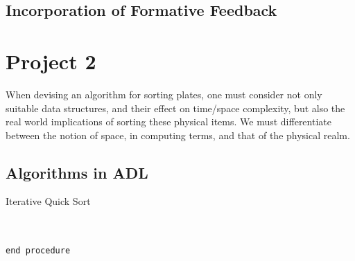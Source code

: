 \documentclass[a4paper]{article}
\begin{document}
\subsection{Incorporation of Formative Feedback}



\newpage







\section{Project 2}
When devising an algorithm for sorting plates, one must consider not only suitable data structures,
and their effect on time/space complexity, but also the real world implications of sorting these physical
items. We must differentiate between the notion of space, in computing terms, and that of the physical realm.\\

\subsection{Algorithms in ADL}


\begin{algorithm}
\caption{Iterative Quick Sort}\label{euclid}
\begin{algorithmic}[1]
 \\
\State{}
\State{}
\State\quad{}
\State\quad{}
\State\quad\quad{}
\State\quad\quad{}
\State\quad\quad\quad {}
\State\quad\quad{}
\State\quad\quad{}
\State\quad{}
\State{}
\State{} \\
{\tt end procedure}
\EndProcedure
\end{algorithmic}
\end{algorithm}
\end{document}
